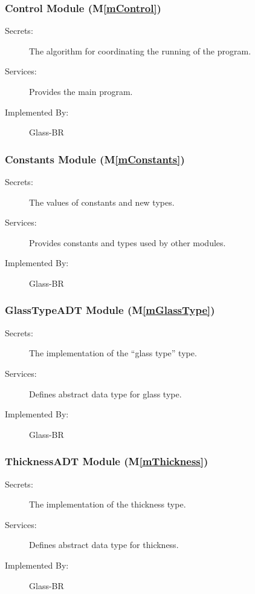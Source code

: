 \documentclass[12pt]{article}
\newcommand{\mref}[1]{M\ref{#1}}
\begin{document}
\subsubsection{Control Module (\mref{mControl})}

\begin{description}
\item[Secrets:] The algorithm for coordinating the running of the program.
\item[Services:] Provides the main program.
\item[Implemented By:] Glass-BR
\end{description}

\subsubsection{Constants Module (\mref{mConstants})}

\begin{description}
\item[Secrets:] The values of constants and new types.
\item[Services:] Provides constants and types used by other modules.
\item[Implemented By:] Glass-BR
\end{description}

\subsubsection{GlassTypeADT Module (\mref{mGlassType})}

\begin{description}
\item[Secrets:] The implementation of the ``glass type'' type.
\item[Services:] Defines abstract data type for glass type.
\item[Implemented By:] Glass-BR
\end{description}

\subsubsection{ThicknessADT Module (\mref{mThickness})}

\begin{description}
\item[Secrets:] The implementation of the thickness type.
\item[Services:]  Defines abstract data type for thickness.
\item[Implemented By:] Glass-BR
\end{description}
\end{document}
